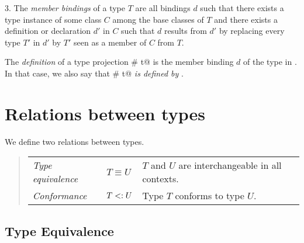 \documentclass[11pt]{report}
\begin{document}
3. The {\em member bindings} of a type $T$ are all bindings $d$ such that
there exists a type instance of some class $C$ among the base classes of $T$
and there exists a definition or declaration $d'$ in $C$
such that $d$ results from $d'$ by replacing every
type $T'$ in $d'$ by $T'$ seen as a member of $C$ from $T$.

The {\em definition} of a type projection \verb@S # t@ is the member
binding $d$ of the type \verb@t@ in \verb@S@. In that case, we also say
that \verb@S # t@ {\em is defined by} \verb@d@.

\section{Relations between types}

We define two relations between types.
\begin{quote}\begin{tabular}{l@{\tab}l@{\tab}l}
\em Type equivalence & $T \equiv U$ & $T$ and $U$ are interchangeable
in all contexts.
\\
\em Conformance & $T <: U$ & Type $T$ conforms to type $U$.
\end{tabular}\end{quote}

\subsection{Type Equivalence}
\label{sec:type-equiv}
\end{document}
